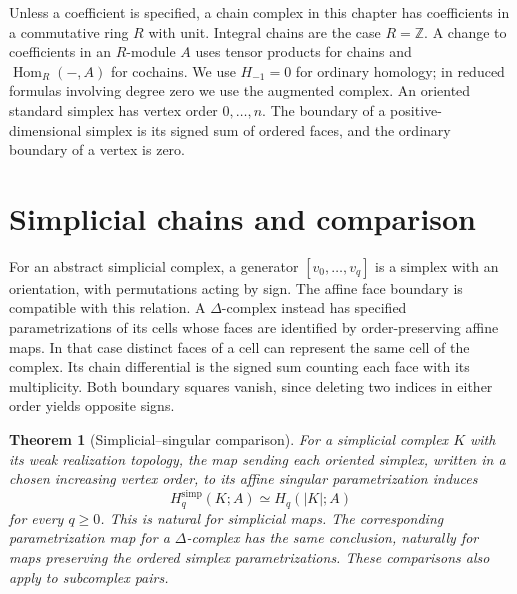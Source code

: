 \documentclass[11pt,oneside,openany]{book}
\theoremstyle{plain}
\newtheorem{theorem}{Theorem}[chapter]
\theoremstyle{definition}
\theoremstyle{remark}
\begin{document}
Unless a coefficient is specified, a chain complex in this chapter has
coefficients in a commutative ring \(R\) with unit. Integral chains are
the case \(R=\mathbb Z\). A change to coefficients in an \(R\)-module
\(A\) uses tensor products for chains and \(\operatorname{Hom}_R(-,A)\)
for cochains. We use \(H_{-1}=0\) for ordinary homology; in reduced
formulas involving degree zero we use the augmented complex. An
oriented standard simplex has vertex order \(0,\ldots,n\). The
boundary of a positive-dimensional simplex is its signed sum of
ordered faces, and the ordinary boundary of a vertex is zero.

\section{Simplicial chains and comparison}\label{p202:T19}

For an abstract simplicial complex, a generator \([v_0,\ldots,v_q]\)
is a simplex with an orientation, with permutations acting by sign.
The affine face boundary is compatible with this relation. A
\(\Delta\)-complex instead has specified parametrizations of its cells
whose faces are identified by order-preserving affine maps. In that
case distinct faces of a cell can represent the same cell of the
complex. Its chain differential is the signed sum counting each face
with its multiplicity. Both boundary squares vanish, since deleting
two indices in either order yields opposite signs.

\begin{theorem}[Simplicial--singular comparison]\label{thm:p202-simplicial-comparison}
For a simplicial complex \(K\) with its weak realization topology,
the map sending each oriented simplex, written in a chosen increasing
vertex order, to its affine singular parametrization induces
\[
 H_q^{\mathrm{simp}}(K;A)\simeq H_q(|K|;A)
\]
for every \(q\geq0\). This is natural for simplicial maps. The
corresponding parametrization map for a \(\Delta\)-complex has the
same conclusion, naturally for maps preserving the ordered simplex
parametrizations. These comparisons also apply to subcomplex pairs.
\end{theorem}
\end{document}
